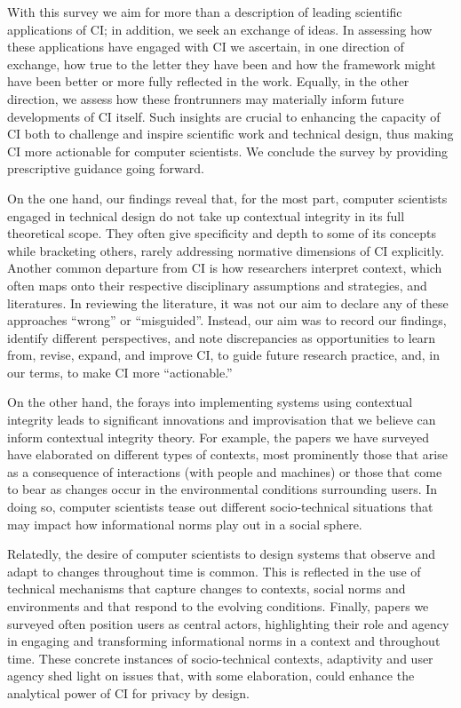 \documentclass[../thesis.tex]{subfiles}
\begin{document}
With this survey we aim for more than a description of leading
scientific applications of CI; in addition, we seek an exchange of
ideas. In assessing how these applications have engaged with CI we
ascertain, in one direction of exchange, how true to the letter they
have been and how the framework might have been better or more fully
reflected in the work. Equally, in the other direction, we assess how
these frontrunners may materially inform future developments of CI
itself. Such insights are crucial to enhancing the capacity of CI both
to challenge and inspire scientific work and technical design, thus
making CI more actionable for computer scientists. We conclude the
survey by providing prescriptive guidance going forward.

On the one hand, our findings reveal that, for the most part, computer
scientists engaged in technical design do not take up contextual
integrity in its full theoretical scope. They often give specificity
and depth to some of its concepts while bracketing others, rarely
addressing normative dimensions of CI explicitly. Another common
departure from CI is how researchers interpret context, which often
maps onto their respective disciplinary assumptions and strategies, and
literatures. In reviewing the literature, it was not our aim to declare
any of these approaches ``wrong'' or
``misguided''. Instead, our aim was
to record our findings, identify different perspectives, and note
discrepancies as opportunities to learn from, revise, expand, and
improve CI, to guide future research practice, and, in our terms, to
make CI more ``actionable.''

On the other hand, the forays into implementing systems using contextual
integrity leads to significant innovations and improvisation that we
believe can inform contextual integrity theory. For example, the papers
we have surveyed have elaborated on different types of contexts, most
prominently those that arise as a consequence of interactions (with
people and machines) or those that come to bear as changes occur in the
environmental conditions surrounding users. In doing so, computer
scientists tease out different socio-technical situations that may
impact how informational norms play out in a social sphere.

Relatedly, the desire of computer scientists to design systems that
observe and adapt to changes throughout time is common. This is
reflected in the use of technical mechanisms that capture changes to
contexts, social norms and environments and that respond to the
evolving conditions. Finally, papers we surveyed often position users
as central actors, highlighting their role and agency in engaging and
transforming informational norms in a context and throughout time.
These concrete instances of socio-technical contexts, adaptivity and
user agency shed light on issues that, with some elaboration, could
enhance the analytical power of CI for privacy by design.
\end{document}
